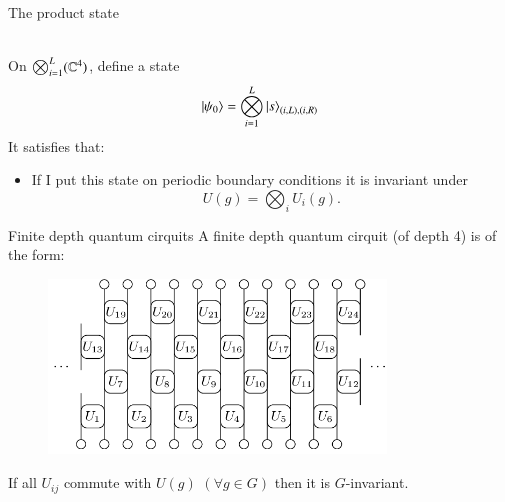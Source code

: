 \documentclass{beamer}
\begin{document}
\begin{frame}{The product state}
	\\
	On $\bigotimes_{i=1}^L(\mathbb{C}^4)$, define a state
	\begin{equation}
		\ket{\psi_0}=\bigotimes_{i=1}^L\ket{s}_{(i,L),(i,R)}
	\end{equation}
	\pause
	It satisfies that:
	\begin{itemize}
		\item If I put this state on periodic boundary conditions it is invariant under
		\begin{equation}
			U(g)=\bigotimes_i U_i(g).
		\end{equation}
	\end{itemize}
\end{frame}

\begin{frame}{Finite depth quantum cirquits}
	A finite depth quantum cirquit (of depth 4) is of the form:
	\begin{figure}
		\center
		\includegraphics[width=0.8\textwidth]{Figures/FiniteDepthQuantumCirquit2.png}
	\end{figure}
	If all $U_{ij}$ commute with $U(g)$ $(\forall g\in G)$ then it is $G$-invariant.
\end{frame}
\end{document}
